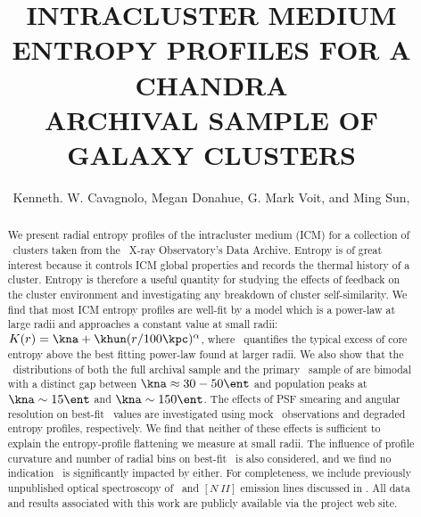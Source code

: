 \documentclass{emulateapj}
\begin{document}
\title{INTRACLUSTER MEDIUM ENTROPY PROFILES FOR A CHANDRA\\ARCHIVAL SAMPLE OF GALAXY CLUSTERS}
\author{
  Kenneth. W. Cavagnolo,
  Megan Donahue,
  G. Mark Voit, and
  Ming Sun,}
\journalinfo{}


\begin{abstract}
   We present radial entropy profiles of the intracluster medium (ICM)
   for a collection of \numcluster\ clusters taken from the
   \chandra\ X-ray Observatory's Data Archive. Entropy is of great
   interest because it controls ICM global properties and records the
   thermal history of a cluster. Entropy is therefore a useful
   quantity for studying the effects of feedback on the cluster
   environment and investigating any breakdown of cluster
   self-similarity. We find that most ICM entropy profiles are
   well-fit by a model which is a power-law at large radii and
   approaches a constant value at small radii: $K(r) = \kna + \khun
   (r/100 \kpc)^{\alpha}$, where \kna\ quantifies the typical excess
   of core entropy above the best fitting power-law found at larger
   radii. We also show that the \kna\ distributions of both the full
   archival sample and the primary \hifl\ sample of \citet{hiflugcs1}
   are bimodal with a distinct gap between $\kna \approx 30-50 \ent$
   and population peaks at $\kna \sim 15 \ent$ and $\kna \sim 150
   \ent$. The effects of PSF smearing and angular resolution on
   best-fit \kna\ values are investigated using mock
   \chandra\ observations and degraded entropy profiles,
   respectively. We find that neither of these effects is sufficient
   to explain the entropy-profile flattening we measure at small
   radii. The influence of profile curvature and number of radial bins
   on best-fit \kna\ is also considered, and we find no indication
   \kna\ is significantly impacted by either. For completeness, we
   include previously unpublished optical spectroscopy of \halpha\ and
   $[N~II]$ emission lines discussed in \citet{haradent}. All data and
   results associated with this work are publicly available via the
   project web site.
\end{abstract}
\end{document}

